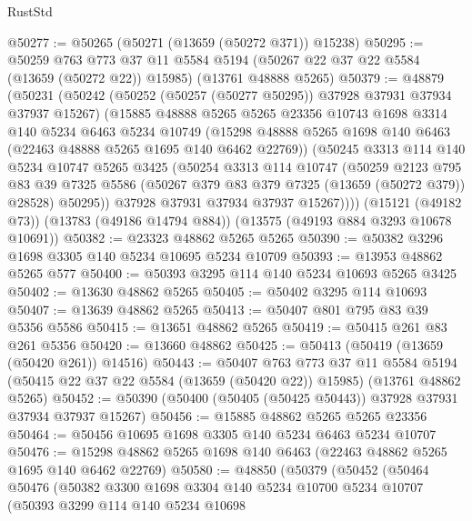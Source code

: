 \begin{lexlean}{RustStd}
\begin{coremodule}
@50277 := @50265 (@50271 (@13659 (@50272 @371)) @15238)
@50295 := @50259
    @763
    @773
    @37
    @11
    @5584
    @5194
    (@50267 @22 @37 @22 @5584 (@13659 (@50272 @22)) @15985)
    (@13761 @48888 @5265)
@50379 := @48879
    (@50231
      (@50242
        (@50252 (@50257 (@50277 @50295)) @37928 @37931 @37934 @37937 @15267)
        (@15885
          @48888
          @5265
          @5265
          @23356
          @10743
          @1698
          @3314
          @140
          @5234
          @6463
          @5234
          @10749
          (@15298 @48888 @5265 @1698 @140 @6463 (@22463 @48888 @5265 @1695 @140 @6462 @22769))
          (@50245
            @3313
            @114
            @140
            @5234
            @10747
            @5265
            @3425
            (@50254
              @3313
              @114
              @10747
              (@50259
                @2123
                @795
                @83
                @39
                @7325
                @5586
                (@50267 @379 @83 @379 @7325 (@13659 (@50272 @379)) @28528)
                @50295))
            @37928
            @37931
            @37934
            @37937
            @15267))))
    (@15121 (@49182 @73))
    (@13783 (@49186 @14794 @884))
    (@13575 (@49193 @884 @3293 @10678 @10691))
@50382 := @23323 @48862 @5265 @5265
@50390 := @50382 @3296 @1698 @3305 @140 @5234 @10695 @5234 @10709
@50393 := @13953 @48862 @5265 @577
@50400 := @50393 @3295 @114 @140 @5234 @10693 @5265 @3425
@50402 := @13630 @48862 @5265
@50405 := @50402 @3295 @114 @10693
@50407 := @13639 @48862 @5265
@50413 := @50407 @801 @795 @83 @39 @5356 @5586
@50415 := @13651 @48862 @5265
@50419 := @50415 @261 @83 @261 @5356
@50420 := @13660 @48862
@50425 := @50413 (@50419 (@13659 (@50420 @261)) @14516)
@50443 := @50407
    @763
    @773
    @37
    @11
    @5584
    @5194
    (@50415 @22 @37 @22 @5584 (@13659 (@50420 @22)) @15985)
    (@13761 @48862 @5265)
@50452 := @50390 (@50400 (@50405 (@50425 @50443)) @37928 @37931 @37934 @37937 @15267)
@50456 := @15885 @48862 @5265 @5265 @23356
@50464 := @50456 @10695 @1698 @3305 @140 @5234 @6463 @5234 @10707
@50476 := @15298 @48862 @5265 @1698 @140 @6463 (@22463 @48862 @5265 @1695 @140 @6462 @22769)
@50580 := @48850
    (@50379
      (@50452
        (@50464
          @50476
          (@50382
            @3300
            @1698
            @3304
            @140
            @5234
            @10700
            @5234
            @10707
            (@50393
              @3299
              @114
              @140
              @5234
              @10698

\end{coremodule}
\end{lexlean}
